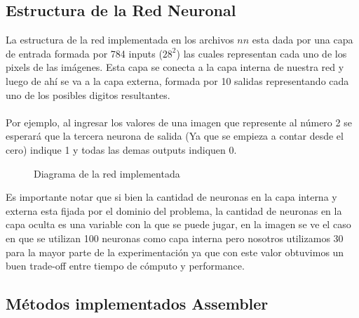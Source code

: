 \subsection{Estructura de la Red Neuronal}

La estructura de la red implementada en los archivos $nn$ esta dada por una capa de entrada formada por 784 inputs ($28^2$) las cuales representan cada uno de los pixels de las imágenes. Esta capa se conecta a la capa interna de nuestra red y luego de ahí se va a la capa externa, formada por 10 salidas representando cada uno de los posibles digitos resultantes.
\\
\\
Por ejemplo, al ingresar los valores de una imagen que represente al número 2 se esperará que la tercera neurona de salida (Ya que se empieza a contar desde el cero) indique 1 y todas las demas outputs indiquen 0.

\begin{figure}[H]
\centering
\caption{Diagrama de la red implementada}
\centering
\end{figure}

Es importante notar que si bien la cantidad de neuronas en la capa interna y externa esta fijada por el dominio del problema, la cantidad de neuronas en la capa oculta es una variable con la que se puede jugar, en la imagen se ve el caso en que se utilizan 100 neuronas como capa interna pero nosotros utilizamos 30 para la mayor parte de la experimentación ya que con este valor obtuvimos un buen trade-off entre tiempo de cómputo y performance.

\subsection{Métodos implementados Assembler}

